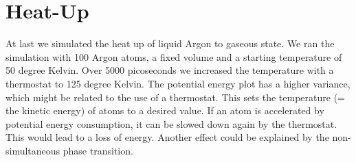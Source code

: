 \documentclass[10pt, a4paper, oneside, twocolumn]{report}
\begin{document}
\section{Heat-Up}

At last we simulated the heat up of liquid Argon to gaseous state. We ran the simulation with 100 Argon atoms, a fixed volume and a starting temperature of 50 degree Kelvin. Over 5000 picoseconds we increased the temperature with a thermostat to 125 degree Kelvin. The potential energy plot has a higher variance, which might be related to the use of a thermostat. This sets the temperature (= the kinetic energy) of atoms to a desired value. If an atom is accelerated by potential energy consumption, it can be slowed down again by the thermostat. This would lead to a loss of energy. Another effect could be explained by the non-simultaneous phase transition.
\end{document}
